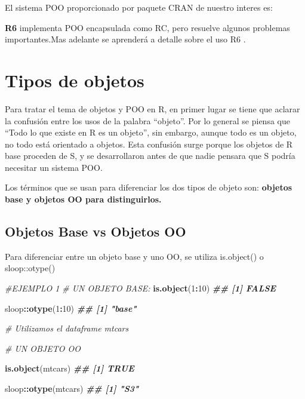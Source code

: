\documentclass[
]{book}
\newenvironment{Shaded}{\begin{snugshade}}{\end{snugshade}}
\newcommand{\CommentTok}[1]{\textcolor[rgb]{0.56,0.35,0.01}{\textit{#1}}}
\newcommand{\DecValTok}[1]{\textcolor[rgb]{0.00,0.00,0.81}{#1}}
\newcommand{\DocumentationTok}[1]{\textcolor[rgb]{0.56,0.35,0.01}{\textbf{\textit{#1}}}}
\newcommand{\FunctionTok}[1]{\textcolor[rgb]{0.13,0.29,0.53}{\textbf{#1}}}
\newcommand{\NormalTok}[1]{#1}
\newcommand{\SpecialCharTok}[1]{\textcolor[rgb]{0.81,0.36,0.00}{\textbf{#1}}}
\begin{document}
El sistema POO proporcionado por paquete CRAN de nuestro interes es:

\textbf{R6} implementa POO encapsulada como RC, pero resuelve algunos problemas importantes.Mas adelante se aprenderá a detalle sobre el uso R6 .

\hypertarget{tipos-de-objetos}{%
\section{Tipos de objetos}\label{tipos-de-objetos}}

Para tratar el tema de objetos y POO en R, en primer lugar se tiene que aclarar la confusión entre los usos de la palabra ``objeto''. Por lo general se piensa que ``Todo lo que existe en R es un objeto'', sin embargo, aunque todo es un objeto, no todo está orientado a objetos. Esta confusión surge porque los objetos de R base proceden de S, y se desarrollaron antes de que nadie pensara que S podría necesitar un sistema POO.

Los términos que se usan para diferenciar los dos tipos de objeto son: \textbf{objetos base y objetos OO para distinguirlos.}

\hypertarget{objetos-base-vs-objetos-oo}{%
\subsection{Objetos Base vs Objetos OO}\label{objetos-base-vs-objetos-oo}}

Para diferenciar entre un objeto base y uno OO, se utiliza is.object() o sloop::otype()

\begin{Shaded}
\begin{Highlighting}[]

\CommentTok{\#EJEMPLO 1}
\CommentTok{\# UN OBJETO BASE:}
\FunctionTok{is.object}\NormalTok{(}\DecValTok{1}\SpecialCharTok{:}\DecValTok{10}\NormalTok{)}
\DocumentationTok{\#\# [1] FALSE}

\NormalTok{sloop}\SpecialCharTok{::}\FunctionTok{otype}\NormalTok{(}\DecValTok{1}\SpecialCharTok{:}\DecValTok{10}\NormalTok{)}
\DocumentationTok{\#\# [1] "base"}

\CommentTok{\# Utilizamos el dataframe mtcars}

\CommentTok{\# UN OBJETO OO}

\FunctionTok{is.object}\NormalTok{(mtcars)}
\DocumentationTok{\#\# [1] TRUE}

\NormalTok{sloop}\SpecialCharTok{::}\FunctionTok{otype}\NormalTok{(mtcars)}
\DocumentationTok{\#\# [1] "S3"}
\end{Highlighting}
\end{Shaded}
\end{document}
